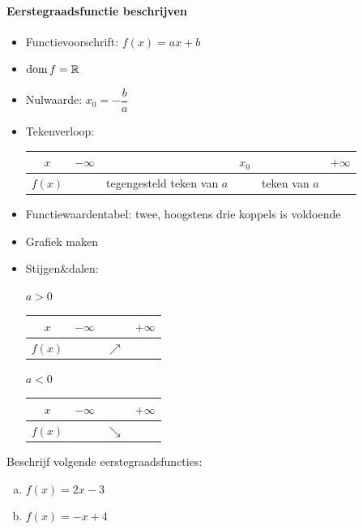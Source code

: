 \documentclass[12pt]{article}
\begin{document}
\paragraph*{Eerstegraadsfunctie beschrijven}
\begin{mdframed}
\begin{itemize}
  \item Functievoorschrift: $f(x)=ax + b$
  \item $\dom f = \mathbb{R}$
  \item Nulwaarde: $x_0=-\dfrac{b}{a}$
  \item Tekenverloop:
  \begin{center}
    \begin{tabular}{c|lp{2.5cm}cp{1.5cm}r}
    $x$ & $-\infty$ & & $x_0$ & & $+\infty$\\
    \hline
    $f(x)$ & & tegengesteld teken van $a$ & & teken van $a$ &       
    \end{tabular}
  \end{center}
  \item Functiewaardentabel: twee, hoogstens drie koppels is voldoende
  \item Grafiek maken
  \item Stijgen\&dalen:\\
  \begin{minipage}{0.45\textwidth}
    \centering $a>0$\\
    \begin{tabular}{c|lcr}
    $x$ & $-\infty$ & & $+\infty$\\
    \hline
    $f(x)$ & & $\nearrow$ &       
    \end{tabular}
  \end{minipage}
  \begin{minipage}{0.45\textwidth}
    \centering $a<0$\\
    \begin{tabular}{c|lcr}
    $x$ & $-\infty$ & & $+\infty$\\
    \hline
    $f(x)$ & & $\searrow$ &       
    \end{tabular}
  \end{minipage}
\end{itemize}
\end{mdframed}

\begin{oefening}
Beschrijf volgende eerstegraadsfuncties:
\begin{enumerate}[(a)]
  \item $f(x)=2x-3$
  \item $f(x)=-x+4$
\end{enumerate}
\end{oefening}
\end{document}
